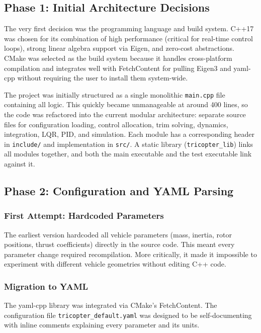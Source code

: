 \documentclass[12pt, a4paper]{article}
\begin{document}
\subsection{Phase 1: Initial Architecture Decisions}

The very first decision was the programming language and build system.  C++17 was chosen for its combination of high performance (critical for real-time control loops), strong linear algebra support via Eigen, and zero-cost abstractions.  CMake was selected as the build system because it handles cross-platform compilation and integrates well with FetchContent for pulling Eigen3 and yaml-cpp without requiring the user to install them system-wide.

The project was initially structured as a single monolithic \texttt{main.cpp} file containing all logic.  This quickly became unmanageable at around 400 lines, so the code was refactored into the current modular architecture: separate source files for configuration loading, control allocation, trim solving, dynamics, integration, LQR, PID, and simulation.  Each module has a corresponding header in \texttt{include/} and implementation in \texttt{src/}.  A static library (\texttt{tricopter\_lib}) links all modules together, and both the main executable and the test executable link against it.

\subsection{Phase 2: Configuration and YAML Parsing}

\subsubsection{First Attempt: Hardcoded Parameters}

The earliest version hardcoded all vehicle parameters (mass, inertia, rotor positions, thrust coefficients) directly in the source code.  This meant every parameter change required recompilation.  More critically, it made it impossible to experiment with different vehicle geometries without editing C++ code.

\subsubsection{Migration to YAML}

The yaml-cpp library was integrated via CMake's FetchContent.  The configuration file \texttt{tricopter\_default.yaml} was designed to be self-documenting with inline comments explaining every parameter and its units.
\end{document}
